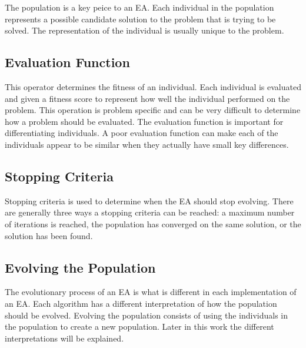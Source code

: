 The population is a key peice to an EA. Each individual in the population represents a possible candidate solution to the problem that is trying to be solved. The representation of the individual is usually unique to the problem.

\subsection{Evaluation Function}

This operator determines the fitness of an individual. Each individual is evaluated and given a fitness score to represent how well the individual performed on the problem. This operation is problem specific and can be very difficult to determine how a problem should be evaluated. The evaluation function is important for differentiating individuals. A poor evaluation function can make each of the individuals appear to be similar when they actually have small key differences. 

\subsection{Stopping Criteria}

Stopping criteria is used to determine when the EA should stop evolving. There are generally three ways a stopping criteria can be reached: a maximum number of iterations is reached, the population has converged on the same solution, or the solution has been found.

\subsection{Evolving the Population}

The evolutionary process of an EA is what is different in each implementation of an EA. Each algorithm has a different interpretation of how the population should be evolved. Evolving the population consists of using the individuals in the population to create a new population. Later in this work the different interpretations will be explained.